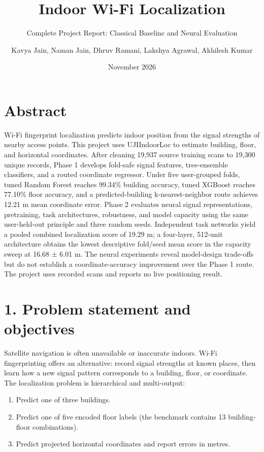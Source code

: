 \documentclass[
  10pt,
  a4paper,
]{article}
\title{Indoor Wi-Fi Localization}
\subtitle{Complete Project Report: Classical Baseline and Neural
Evaluation}
\author{Kavya Jain, Naman Jain, Dhruv Ramani, Lakshya Agrawal, Akhilesh Kumar}
\date{November 2026}
\providecommand{\tightlist}{%
  \setlength{\itemsep}{0pt}\setlength{\parskip}{0pt}}
\begin{document}
\maketitle

{
\hypersetup{linkcolor=}
\setcounter{tocdepth}{3}
\tableofcontents
}
\section{Abstract}\label{abstract}

Wi-Fi fingerprint localization predicts indoor position from the signal
strengths of nearby access points. This project uses UJIIndoorLoc to
estimate building, floor, and horizontal coordinates. After cleaning
19,937 source training scans to 19,300 unique records, Phase 1 develops
fold-safe signal features, tree-ensemble classifiers, and a routed
coordinate regressor. Under five user-grouped folds, tuned Random Forest
reaches 99.34\% building accuracy, tuned XGBoost reaches 77.10\% floor
accuracy, and a predicted-building k-nearest-neighbor route achieves
12.21 m mean coordinate error. Phase 2 evaluates neural signal
representations, pretraining, task architectures, robustness, and model
capacity using the same user-held-out principle and three random seeds.
Independent task networks yield a pooled combined localization score of
19.29 m; a four-layer, 512-unit architecture obtains the lowest
descriptive fold/seed mean score in the capacity sweep at 16.68 ± 6.01
m. The neural experiments reveal model-design trade-offs but do not
establish a coordinate-accuracy improvement over the Phase 1 route. The
project uses recorded scans and reports no live positioning result.

\section{1. Problem statement and
objectives}\label{problem-statement-and-objectives}

Satellite navigation is often unavailable or inaccurate indoors. Wi-Fi
fingerprinting offers an alternative: record signal strengths at known
places, then learn how a new signal pattern corresponds to a building,
floor, or coordinate. The localization problem is hierarchical and
multi-output:

\begin{enumerate}
\def\labelenumi{\arabic{enumi}.}
\tightlist
\item
  Predict one of three buildings.
\item
  Predict one of five encoded floor labels (the benchmark contains 13
  building-floor combinations).
\item
  Predict projected horizontal coordinates and report errors in metres.
\end{enumerate}
\end{document}
